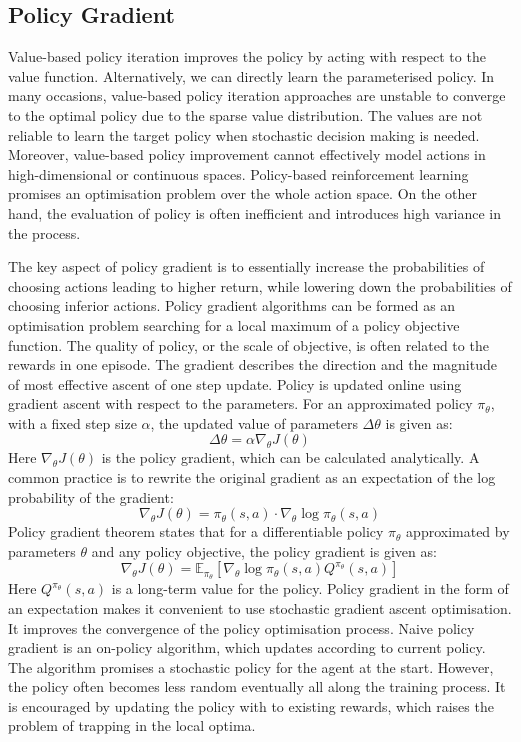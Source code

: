 \documentclass[oneside,11pt,a4paper]{article}
\begin{document}
\subsection{Policy Gradient}
Value-based policy iteration improves the policy by acting with respect to the value function. Alternatively, we can directly learn the parameterised policy. In many occasions, value-based policy iteration approaches are unstable to converge to the optimal policy due to the sparse value distribution. The values are not reliable to learn the target policy when stochastic decision making is needed. Moreover, value-based policy improvement cannot effectively model actions in high-dimensional or continuous spaces. Policy-based reinforcement learning promises an optimisation problem over the whole action space. On the other hand, the evaluation of policy is often inefficient and introduces high variance in the process.

\noindent
The key aspect of policy gradient is to essentially increase the probabilities of choosing actions leading to higher return, while lowering down the probabilities of choosing inferior actions. Policy gradient algorithms can be formed as an optimisation problem searching for a local maximum of a policy objective function. \cite{pg} The quality of policy, or the scale of objective, is often related to the rewards in one episode. The gradient describes the direction and the magnitude of most effective ascent of one step update. Policy is updated online using gradient ascent with respect to the parameters. For an approximated policy $\pi_\theta$, with a fixed step size $\alpha$, the updated value of parameters $\Delta \theta$ is given as:
$$
\Delta\theta=\alpha\nabla_\theta J(\theta)
$$
Here $\nabla_\theta J(\theta)$ is the policy gradient, which can be calculated analytically. A common practice is to rewrite the original gradient as an expectation of the log probability of the gradient:
$$
\nabla_\theta J(\theta) = \pi_\theta(s,a)\cdot\nabla_\theta \log\pi_\theta(s,a)
$$
Policy gradient theorem states that for a differentiable policy $\pi_\theta$ approximated by parameters $\theta$ and any policy objective, the policy gradient is given as:
$$
\nabla_\theta J(\theta) = \mathbb E_{\pi_\theta}[\nabla_\theta\log\pi_\theta(s,a)Q^{\pi_\theta}(s,a)]
$$
Here $Q^{\pi_\theta}(s,a)$ is a long-term value for the policy. Policy gradient in the form of an expectation makes it convenient to use stochastic gradient ascent optimisation. It improves the convergence of the policy optimisation process. Naive policy gradient is an on-policy algorithm, which updates according to current policy. The algorithm promises a stochastic policy for the agent at the start. However, the policy often becomes less random eventually all along the training process. It is encouraged by updating the policy with to existing rewards, which raises the problem of trapping in the local optima.
\end{document}

